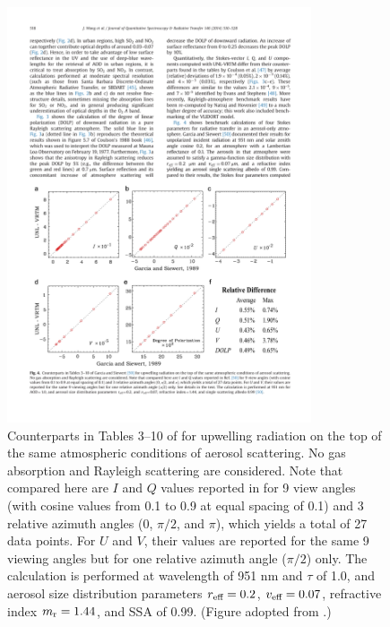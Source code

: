 \begin{figure}[t]
  \centering
  \includegraphics[width={0.8\textwidth}]{figures/unlvrtm3.pdf}
  \caption{Counterparts in Tables 3--10 of \citet{Garcia89} for
upwelling radiation on the top of the same atmospheric conditions of
aerosol scattering. No gas absorption and Rayleigh scattering are
considered. Note that compared here are $I$ and $Q$ values reported 
in \citet{Garcia89} for 9 view angles (with cosine values from 0.1 
to 0.9 at equal spacing of 0.1) and 3 relative azimuth angles 
(0, $\pi/2$, and $\pi$), which yields a total of 27 data points. 
For $U$ and $V$, their values are reported for the same 9 viewing angles 
but for one relative azimuth angle ($\pi/2$) only. 
The calculation is performed at wavelength of 951 nm and $\tau$ of 1.0, 
and aerosol size distribution parameters $r_\text{eff}=0.2$, 
$v_\text{eff}=0.07$, refractive index $m_\text{r}=1.44$, and SSA of 0.99.
(Figure adopted from \citet{Wang14}.) }
  \label{fig:unlvrtm3}
\end{figure}

